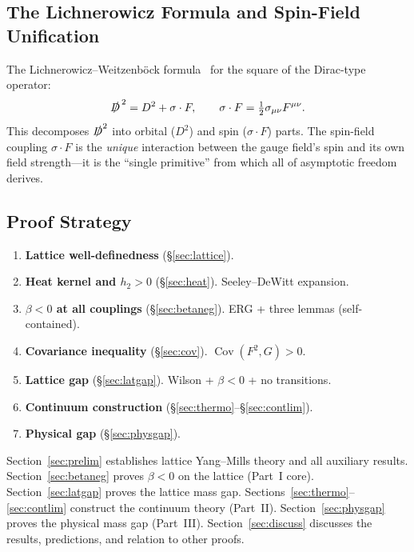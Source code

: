 \documentclass[12pt,a4paper]{article}
\theoremstyle{plain}
\theoremstyle{definition}
\theoremstyle{remark}
\begin{document}
\subsection{The Lichnerowicz Formula and Spin-Field Unification}\label{sec:lich}
The Lichnerowicz--Weitzenb\"ock formula~\cite{Gilkey1995} for the square of the Dirac-type operator:
\begin{equation}\label{eq:Lich}
\slashed{D}^{\,2} = D^2 + \sigma\cdot F, \qquad \sigma\cdot F=\tfrac{1}{2}\sigma_{\mu\nu}F^{\mu\nu}.
\end{equation}
This decomposes $\slashed{D}^2$ into orbital ($D^2$) and spin ($\sigma\cdot F$) parts. The spin-field coupling $\sigma\cdot F$ is the \emph{unique} interaction between the gauge field's spin and its own field strength---it is the ``single primitive'' from which all of asymptotic freedom derives.

\subsection{Proof Strategy}\label{sec:strategy}
\begin{enumerate}[label=\textbf{S\arabic*},leftmargin=3em]
\item \textbf{Lattice well-definedness} (\S\ref{sec:lattice}).
\item \textbf{Heat kernel and $h_2>0$} (\S\ref{sec:heat}). Seeley--DeWitt expansion.
\item \textbf{$\beta<0$ at all couplings} (\S\ref{sec:betaneg}). ERG + three lemmas (self-contained).
\item \textbf{Covariance inequality} (\S\ref{sec:cov}). $\operatorname{Cov}(F^2,G)>0$.
\item \textbf{Lattice gap} (\S\ref{sec:latgap}). Wilson + $\beta<0$ + no transitions.
\item \textbf{Continuum construction} (\S\ref{sec:thermo}--\S\ref{sec:contlim}).
\item \textbf{Physical gap} (\S\ref{sec:physgap}).
\end{enumerate}
Section~\ref{sec:prelim} establishes lattice Yang--Mills theory and all auxiliary results. Section~\ref{sec:betaneg} proves $\beta<0$ on the lattice (Part~I core). Section~\ref{sec:latgap} proves the lattice mass gap. Sections~\ref{sec:thermo}--\ref{sec:contlim} construct the continuum theory (Part~II). Section~\ref{sec:physgap} proves the physical mass gap (Part~III). Section~\ref{sec:discuss} discusses the results, predictions, and relation to other proofs.
\end{document}
